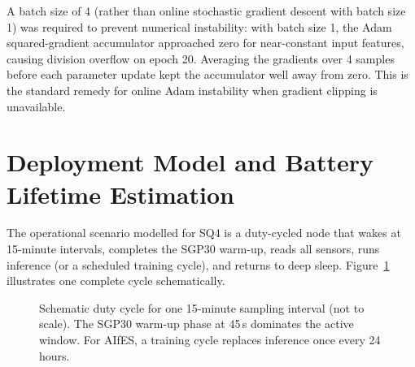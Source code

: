 A batch size of 4 (rather than online stochastic gradient descent with batch size 1) was required to prevent numerical instability: with batch size 1, the Adam squared-gradient accumulator approached zero for near-constant input features, causing division overflow on epoch 20. Averaging the gradients over 4 samples before each parameter update kept the accumulator well away from zero. This is the standard remedy for online Adam instability when gradient clipping is unavailable.

\section{Deployment Model and Battery Lifetime Estimation}\label{sec:deployment_model}

The operational scenario modelled for SQ4 is a duty-cycled node that wakes at 15-minute intervals, completes the SGP30 warm-up, reads all sensors, runs inference (or a scheduled training cycle), and returns to deep sleep. Figure~\ref{fig:duty_cycle} illustrates one complete cycle schematically.

\begin{figure}[htbp]
\centering
{}
\caption{Schematic duty cycle for one 15-minute sampling interval (not to scale). The SGP30 warm-up phase at 45\,s dominates the active window. For AIfES, a training cycle replaces inference once every 24 hours.}
\label{fig:duty_cycle}
\end{figure}

